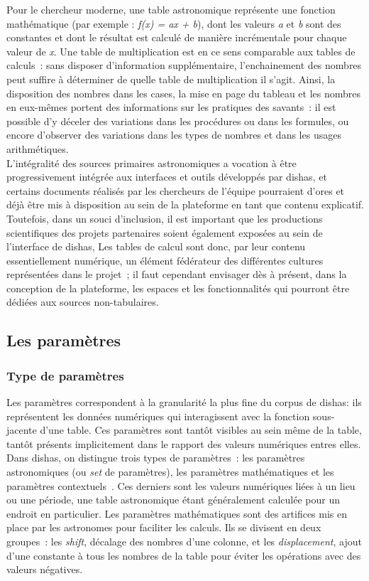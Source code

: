\documentclass[a4paper,12pt,twoside]{book}
\newcommand{\eng}{\emph}
\newcommand{\g}[1]{\og#1~\fg}
\newcommand{\dishas}{\gls{dishas}\xspace}
\begin{document}
Pour le chercheur moderne, une table astronomique représente une fonction mathématique (par exemple : \emph{f(x) = ax + b}), dont les valeurs \emph{a} et \emph{b} sont des constantes et dont le résultat est calculé de manière incrémentale pour chaque valeur de \emph{x}. Une table de multiplication est en ce sens comparable aux tables de calculs~: sans disposer d'information supplémentaire, l'enchainement des nombres peut suffire à déterminer de quelle table de multiplication il s'agit. Ainsi, la disposition des nombres dans les cases, la mise en page du tableau et les nombres en eux-mêmes portent des informations sur les pratiques des savants~: il est possible d'y déceler des variations dans les procédures ou dans les formules, ou encore d'observer des variations dans les types de nombres et dans les usages arithmétiques.\\

L'intégralité des sources primaires astronomiques a vocation à être progressivement intégrée aux interfaces et outils développés par \dishas, et certains documents réalisés par les chercheurs de l'équipe pourraient d'ores et déjà être mis à disposition au sein de la plateforme en tant que contenu explicatif. Toutefois, dans un souci d'inclusion, il est important que les productions scientifiques des projets partenaires soient également exposées au sein de l'interface de \dishas, Les tables de calcul sont donc, par leur contenu essentiellement numérique, un élément fédérateur des différentes cultures représentées dans le projet~; il faut cependant envisager dès à présent, dans la conception de la plateforme, les espaces et les fonctionnalités qui pourront être dédiées aux sources non-tabulaires.

		\subsection{Les paramètres}
			\subsubsection{Type de paramètres}
Les paramètres correspondent à la granularité la plus fine du corpus de \dishas: ils représentent les données numériques qui interagissent avec la fonction sous-jacente d'une table. Ces paramètres sont tantôt visibles au sein même de la table, tantôt présents implicitement dans le rapport des valeurs numériques entres elles. Dans \dishas, on distingue trois types de paramètres~: les paramètres astronomiques (ou \eng{set} de paramètres), les paramètres mathématiques et les paramètres \g{contextuels}. Ces derniers sont les valeurs numériques liées à un lieu ou une période, une table astronomique étant généralement calculée pour un endroit en particulier. Les paramètres mathématiques sont des artifices mis en place par les astronomes pour faciliter les calculs. Ils se divisent en deux groupes~: les \eng{shift}, décalage des nombres d'une colonne, et les \eng{displacement}, ajout d'une constante à tous les nombres de la table pour éviter les opérations avec des valeurs négatives.
\end{document}
